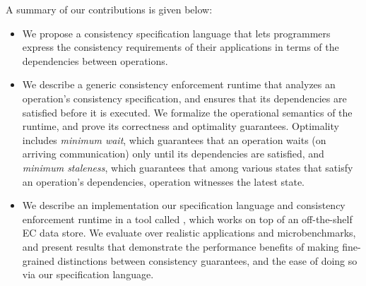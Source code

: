 A summary of our contributions is given below:
\begin{itemize}
  \item We propose a consistency specification language that lets
    programmers express the consistency requirements of their
    applications in terms of the dependencies between operations.

  \item We describe a generic consistency enforcement runtime that
    analyzes an operation's consistency specification, and ensures
    that its dependencies are satisfied before it is executed. We
    formalize the operational semantics of the runtime, and prove its
    correctness and optimality guarantees. Optimality includes
    \emph{minimum wait}, which guarantees that an operation waits (on
    arriving communication) only until its dependencies are satisfied,
    and \emph{minimum staleness}, which guarantees that among various
    states that satisfy an operation's dependencies, operation
    witnesses the latest state.
  
  \item We describe an implementation our specification language and
    consistency enforcement runtime in a tool called \tool, which
    works on top of an off-the-shelf EC data store. We evaluate \tool
    over realistic applications and microbenchmarks, and present
    results that demonstrate the performance benefits of making
    fine-grained distinctions between consistency guarantees, and the
    ease of doing so via our specification language.

\end{itemize}

